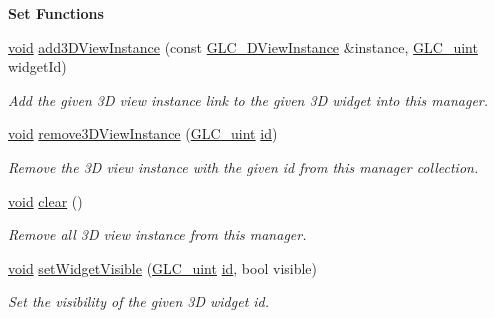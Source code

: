 \begin{Indent}{\bf Set Functions}
\begin{DoxyCompactItemize}
\hyperlink{group___u_a_v_objects_plugin_ga444cf2ff3f0ecbe028adce838d373f5c}{void} \hyperlink{class_g_l_c__3_d_widget_manager_handle_a1f2859f01eb258b95f354214c64b8e7d}{add3\-D\-View\-Instance} (const \hyperlink{class_g_l_c__3_d_view_instance}{G\-L\-C\-\_\-D\-View\-Instance} \&instance, \hyperlink{glc__global_8h_abf950976fabed69026558df8e2da6c6b}{G\-L\-C\-\_\-uint} widget\-Id)
\begin{DoxyCompactList}\small\item\em Add the given 3\-D view instance link to the given 3\-D widget into this manager. \end{DoxyCompactList}\item 
\hyperlink{group___u_a_v_objects_plugin_ga444cf2ff3f0ecbe028adce838d373f5c}{void} \hyperlink{class_g_l_c__3_d_widget_manager_handle_ac26759b7d2ee545547b58db7c8dc1325}{remove3\-D\-View\-Instance} (\hyperlink{glc__global_8h_abf950976fabed69026558df8e2da6c6b}{G\-L\-C\-\_\-uint} \hyperlink{glext_8h_a58c2a664503e14ffb8f21012aabff3e9}{id})
\begin{DoxyCompactList}\small\item\em Remove the 3\-D view instance with the given id from this manager collection. \end{DoxyCompactList}\item 
\hyperlink{group___u_a_v_objects_plugin_ga444cf2ff3f0ecbe028adce838d373f5c}{void} \hyperlink{class_g_l_c__3_d_widget_manager_handle_aaac9f06e711f2d6b2721f01802802b28}{clear} ()
\begin{DoxyCompactList}\small\item\em Remove all 3\-D view instance from this manager. \end{DoxyCompactList}\item 
\hyperlink{group___u_a_v_objects_plugin_ga444cf2ff3f0ecbe028adce838d373f5c}{void} \hyperlink{class_g_l_c__3_d_widget_manager_handle_a4331489f0b38438519608dbfcd272e68}{set\-Widget\-Visible} (\hyperlink{glc__global_8h_abf950976fabed69026558df8e2da6c6b}{G\-L\-C\-\_\-uint} \hyperlink{glext_8h_a58c2a664503e14ffb8f21012aabff3e9}{id}, bool visible)
\begin{DoxyCompactList}\small\item\em Set the visibility of the given 3\-D widget id. \end{DoxyCompactList}\end{DoxyCompactItemize}
\end{Indent}
